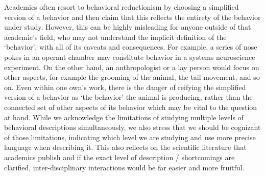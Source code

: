 \documentclass[a4paper, 11pt]{article}
\begin{document}




Academics often resort to behavioral reductionism by choosing a simplified version of a behavior and then claim that this reflects the entirety of the behavior under study. However, this can be highly misleading for anyone outside of that academic's field, who may not understand the implicit definition of the `behavior', with all of its caveats and consequences. For example, a series of nose pokes in an operant chamber may constitute behavior in a systems neuroscience experiment. On the other hand, an anthropologist or a lay person would focus on other aspects, for example the grooming of the animal, the tail movement, and so on. Even within one own's work, there is the danger of reifying the simplified version of a behavior as `the behavior' the animal is producing, rather than the connected set of other aspects of its behavior which may be vital to the question at hand. While we acknowledge the limitations of studying multiple levels of behavioral descriptions simultaneously, we also stress that we should be cognizant of those limitations, indicating which level we are studying and use more precise language when describing it. This also reflects on the scientific literature that academics publish and if the exact level of description / shortcomings are clarified, inter-disciplinary interactions would be far easier and more fruitful. 
\end{document}
